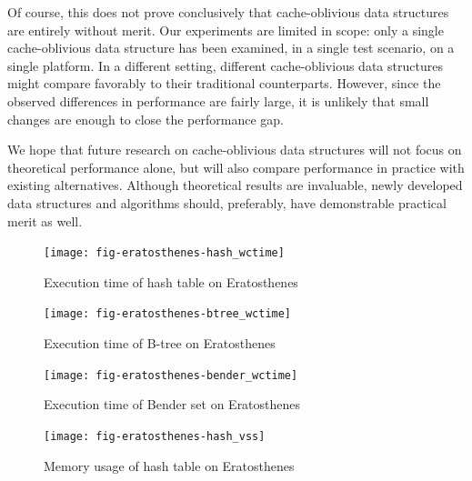 \documentclass{acm_proc_article-sp}
\begin{document}
Of course, this does not prove conclusively that cache-oblivious data structures
are entirely without merit. Our experiments are limited in scope: only a single
cache-oblivious data structure has been examined, in a single test scenario,
on a single platform.
In a different setting, different cache-oblivious data structures might compare
favorably to their traditional counterparts.
However, since the observed differences in performance are fairly large,
it is unlikely that small changes are enough to close the performance gap.

We hope that future research on cache-oblivious data structures will not focus
on theoretical performance alone, but will also compare performance in practice
with existing alternatives.
Although theoretical results are invaluable, newly developed data structures and
algorithms should, preferably, have demonstrable practical merit as well.






\begin{figure}[p]
\centering
\texttt{[image: fig-eratosthenes-hash\_wctime]}
\caption{Execution time of hash table on Eratosthenes}
\label{fig-eratosthenes-hash_wctime}
\end{figure}

\begin{figure}[p]
\centering
\texttt{[image: fig-eratosthenes-btree\_wctime]}
\caption{Execution time of B-tree on Eratosthenes}
\label{fig-eratosthenes-btree_wctime}
\end{figure}

\begin{figure}[p]
\centering
\texttt{[image: fig-eratosthenes-bender\_wctime]}
\caption{Execution time of Bender set on Eratosthenes}
\label{fig-eratosthenes-bender_wctime}
\end{figure}

\begin{figure}[p]
\centering
\texttt{[image: fig-eratosthenes-hash\_vss]}
\caption{Memory usage of hash table on Eratosthenes}
\label{fig-eratosthenes-hash_vss}
\end{figure}
\end{document}
